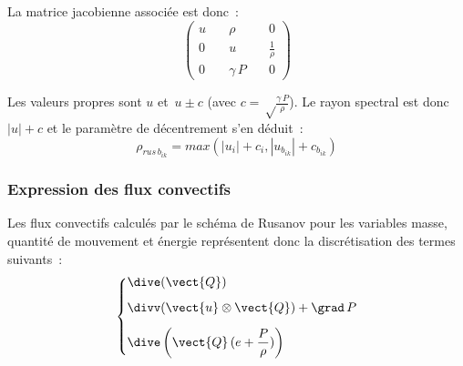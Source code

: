 La matrice jacobienne associée est donc~:
\begin{equation}
\left(
\begin{aligned}
u &\quad \rho &\quad 0\\
0 &\quad u &\quad \displaystyle\frac{1}{\rho}\\
0 &\quad \gamma\, P &\quad 0
\end{aligned}
\right)
\end{equation}

Les valeurs propres sont $u$ et $\displaystyle\,u\pm c$ (avec
$c=\sqrt\frac{\gamma\,P}{\rho}$). Le rayon spectral est donc
$|u|+c$ et le paramètre de décentrement s'en déduit~:
\begin{equation}
\rho_{rus\,{b}_{ik}} = max\left(|u_i|+c_i,|u_{{b}_{ik}}|+c_{{b}_{ik}}\right)
\end{equation}


\subsubsection*{Expression des flux convectifs}

Les flux convectifs calculés par le schéma de Rusanov
pour les variables masse, quantité de mouvement
et énergie représentent donc la discrétisation des termes suivants~:
\begin{equation}
\left\{
\begin{aligned}
&\displaystyle\dive(\vect{Q})\\[0.5em]
&\displaystyle\divv(\vect{u}\otimes\vect{Q})+\grad\,P\\[0.5em]
&\displaystyle\dive\left(\vect{Q}\,(e+\frac{P}{\rho})\right)
\end{aligned}
\right.
\end{equation}

